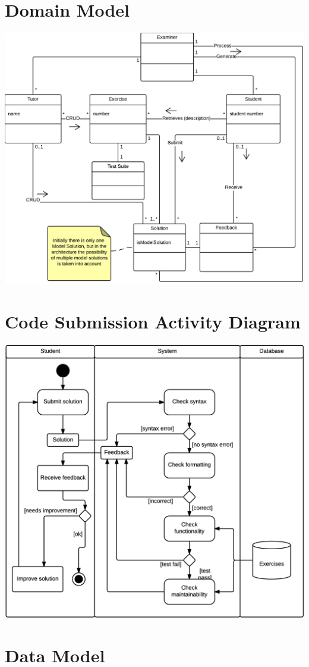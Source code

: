 \chapter{Domain Model} \label{app:domain-model}
\includegraphics[scale=0.75]{appendices/diagrams-images/domain-model}
\chapter{Code Submission Activity Diagram} \label{app:activity-diagram}
\includegraphics[scale=0.75]{appendices/diagrams-images/code-submission-activity-diagram}
\chapter{Data Model} \label{app:data-model}
